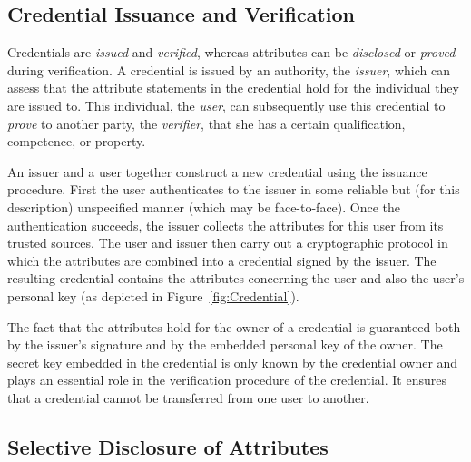 \subsection{Credential Issuance and Verification}

Credentials are \emph{issued} and \emph{verified}, whereas attributes can be
\emph{disclosed} or \emph{proved} during verification. A credential is issued
by an authority, the \emph{issuer}, which can assess that the
attribute statements in the credential hold for the
individual they are issued to. This individual, the \emph{user}, can
subsequently use this credential to \emph{prove} to another party, the
\emph{verifier}, that she has a certain qualification,
competence, or property.

An issuer and a user together construct a new credential using the issuance
procedure. First the user authenticates
 to the issuer in some reliable but (for this
description) unspecified manner (which may be face-to-face). Once the
authentication succeeds, the issuer collects the
attributes for this user from its trusted sources. The user
and issuer then carry out a cryptographic protocol in which the attributes
are combined into a credential signed by the issuer. The resulting credential
contains the attributes concerning the user and also the user's personal key (as
depicted in Figure~\ref{fig:Credential}).

The fact that the attributes hold for the owner of a
credential is guaranteed both by the issuer's signature and by the embedded
personal key of the owner. The secret key embedded in the credential is only
known by the credential owner and plays an essential role in the verification
procedure of the credential. It ensures that a
credential cannot be transferred from one user to another.

\subsection{Selective Disclosure of Attributes}


